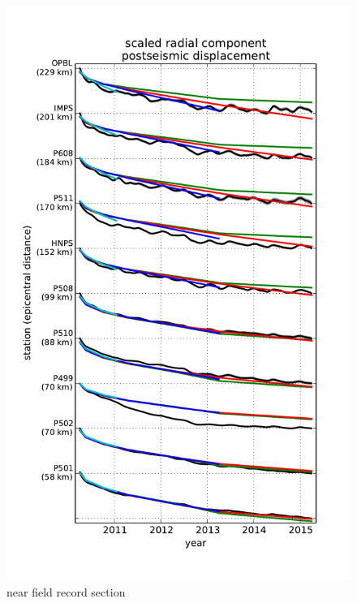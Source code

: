 \documentclass[12pt]{article}
\begin{document}
\begin{figure}
\includegraphics[scale=0.9]{Figures/near_field_record_section}
\centering 
\caption{near field record section}
\label{fig:NearFieldRS}
\end{figure}
\end{document}
